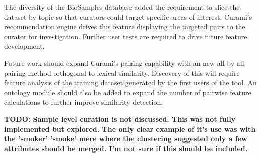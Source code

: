 \documentclass{bmcart}
\begin{document}
The diversity of the BioSamples database added the requirement to slice the dataset by topic so that curators could target specific areas of interest. Curami's recommendation engine drives this feature displaying the targeted pairs to the curator for investigation. Further user tests are required to drive future feature development.

Future work should expand Curami's pairing capability with an new all-by-all pairing method orthogonal to lexical similarity. Discovery of this will require feature analysis of the training dataset generated by the first users of the tool. An ontology module should also be added to expand the number of pairwise feature calculations to further improve similarity detection.

\textbf{TODO: Sample level curation is not discussed. This was not fully implemented but explored. The only clear example of it's use was with the 'smoker' 'smoke' mere where the clustering suggested only a few attributes should be merged. I'm not sure if this should be included.}







\end{document}
